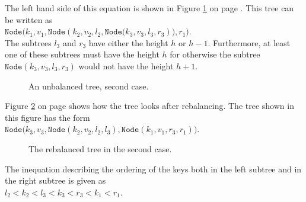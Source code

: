 \begin{enumerate}
       The left hand side of this equation is shown in Figure  \ref{fig:caselr} on page
       \pageref{fig:caselr}.  This tree can be written as
       \\[0.2cm]
       \hspace*{1.3cm} 
       $\texttt{Node}\bigl(k_1,v_1,\texttt{Node}(k_2,v_2,l_2,\texttt{Node}\bigl(k_3,v_3,l_3,r_3)\bigr),r_1\bigr)$. 
       \\[0.2cm]
       The subtrees $l_3$ and $r_3$ have either the height  $h$ or $h-1$.  Furthermore, at least one
       of these subtrees must have the height  $h$ for otherwise the subtree
       $\texttt{Node}(k_3,v_3,l_3,r_3)$ would not have the height $h+1$.
       
\begin{figure}[!ht]
  \centering
  \caption{An unbalanced tree, second case.}
  \label{fig:caselr}
\end{figure}

     Figure \ref{fig:caselr-nach} on page \pageref{fig:caselr-nach} shows how the tree looks after
     rebalancing.  The tree shown in this figure has the form
     \\[0.2cm]
     \hspace*{1.3cm} 
     $\texttt{Node}\bigl(k_3,v_3,\texttt{Node}(k_2,v_2,l_2,l_3),\texttt{Node}(k_1,v_1,r_3,r_1) \bigr)$.


\begin{figure}[!ht]
  \centering
  \caption{The rebalanced tree in the second case.}
  \label{fig:caselr-nach}
\end{figure}

      The inequation describing the ordering of the keys both in the left subtree and in the right
      subtree is given as
      \\[0.2cm]
      \hspace*{1.3cm} $l_2 < k_2 < l_3 < k_3 < r_3 < k_1 < r_1$.


\end{enumerate}
